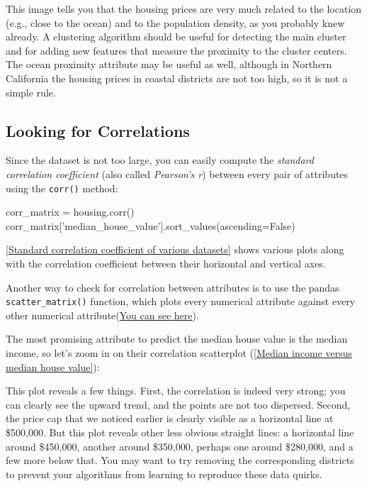 This image tells you that the housing prices are very much related to the location
(e.g., close to the ocean) and to the population density, as you probably knew already.
A clustering algorithm should be useful for detecting the main cluster and for adding
new features that measure the proximity to the cluster centers. The ocean proximity
attribute may be useful as well, although in Northern California the housing prices in
coastal districts are not too high, so it is not a simple rule.

\subsection{Looking for Correlations}
Since the dataset is not too large, you can easily compute the \emph{standard correlation
coefficient} (also called \emph{Pearson's r}) between every pair of attributes using the \verb|corr()| method:
\begin{pyc}
corr_matrix = housing.corr()
corr_matrix['median_house_value'].sort_values(ascending=False)
\end{pyc}

\autoref{Standard correlation coefficient of various datasets} shows various plots along with the correlation coefficient between their horizontal and vertical axes.


Another way to check for correlation between attributes is to use the pandas
\verb|scatter_matrix()| function, which plots every numerical attribute against every other numerical attribute(\href{https://github.com/JPL-JUNO/HOML/blob/main/chapter/chapter2.ipynb}{You can see here}).

The most promising attribute to predict the median house value is the median
income, so let's zoom in on their correlation scatterplot (\autoref{Median income versus median house value}):


This plot reveals a few things. First, the correlation is indeed very strong; you can
clearly see the upward trend, and the points are not too dispersed. Second, the price
cap that we noticed earlier is clearly visible as a horizontal line at \$500,000. But this
plot reveals other less obvious straight lines: a horizontal line around \$450,000,
another around \$350,000, perhaps one around \$280,000, and a few more below that.
You may want to try removing the corresponding districts to prevent your algorithms
from learning to reproduce these data quirks.

